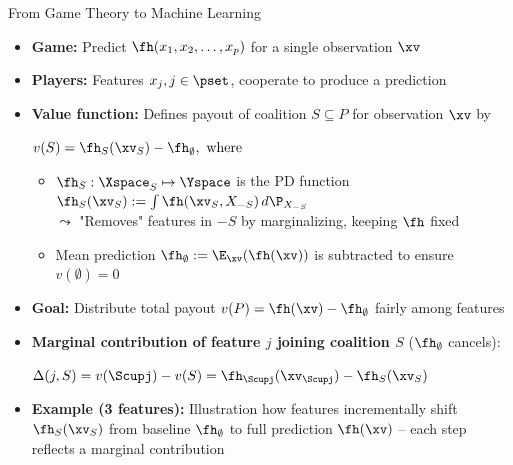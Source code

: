 \documentclass[11pt,compress,t,notes=noshow, aspectratio=169, xcolor=table]{beamer}
\begin{document}
\begin{frame}{From Game Theory to Machine Learning}
\begin{itemize}%
    \item \textbf{Game:} Predict $\fh(x_1, x_2, \ldots, x_p)$ for a single observation $\xv$
    \item \textbf{Players:} Features $x_j, j \in \pset$, cooperate to produce a prediction
    \item \textbf{Value function:} Defines payout of coalition $S \subseteq P$ for observation $\xv$ by
    
    \medskip
    \centerline{$v(S) = \fh_{S} (\xv_S) - \fh_{\emptyset} , \text{ where }$}
    \medskip
    
    \begin{itemize}
        \item $ \fh_S: \Xspace_S \mapsto \Yspace$ is the PD function 
  $\fh_S(\xv_S) := \int \fh(\xv_S, X_{-S}) \, d\P_{X_{-S}}$\\
    $\leadsto$ "Removes" features in $-S$ by marginalizing, keeping $\fh$ fixed

    \item Mean prediction $\fh_{ \emptyset} := \E_{\xv}(\fh(\xv))$ is subtracted to ensure $v(\emptyset) = 0$

    \end{itemize}
    
  \item \textbf{Goal:} 
  Distribute total payout $v(P) = \fh(\xv) - \fh_\emptyset$ fairly among features%
  \pause
    \item \textbf{Marginal contribution of feature $j$ joining coalition $S$} ($\fh_{ \emptyset}$ cancels):
    
    \medskip
    \centerline{$\Delta(j, S) = v(\Scupj) - v(S) =  \fh_{\Scupj} (\xv_{\Scupj}) - \fh_{S} (\xv_{S})$}
    \medskip
    
        \item %
         \textbf{Example (3 features):} Illustration how features incrementally shift $\fh_S(\xv_S)$ from baseline $\fh_\emptyset$ to full prediction $\fh(\xv)$ -- each step reflects a marginal contribution
    \resizebox{\linewidth}{!}{
\begin{tikzpicture}[
  dot/.style = {circle, fill, inner sep=2pt},
  arrow/.style = {-stealth, gray, semithick}
]


\end{tikzpicture}}
\end{itemize}
\end{frame}
\end{document}
